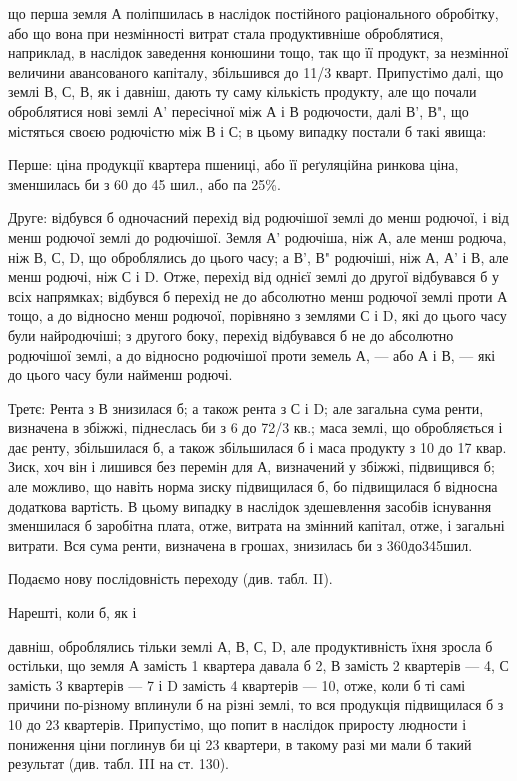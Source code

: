 що перша земля А поліпшилась в наслідок постійного раціонального обробітку,
або що вона при незмінності витрат стала продуктивніше оброблятися,
наприклад, в наслідок заведення конюшини тощо, так що її продукт, за незмінної
величини авансованого капіталу, збільшився до 11/3 кварт. Припустімо
далі, що землі В, С, В, як і давніш, дають ту саму кількість продукту, але що
почали оброблятися нові землі А' пересічної між А і В родючости, далі В', В", що
містяться своєю родючістю між В і С; в цьому випадку постали б такі явища:

Перше: ціна продукції квартера пшениці, або її реґуляційна ринкова
ціна, зменшилась би з 60 до 45 шил., або па 25\%.

Друге: відбувся б одночасний перехід від родючішої землі до менш
родючої, і від менш родючої землі до родючішої. Земля А' родючіша, ніж А, але
менш родюча, ніж В, С, D, що оброблялись до цього часу; а В', В" родючіші, ніж
А, А' і В, але менш родючі, ніж С і D. Отже, перехід від однієї землі до другої
відбувався б у всіх напрямках; відбувся б перехід не до абсолютно
менш родючої землі проти А тощо, а до відносно менш родючої, порівняно
з землями С і D, які до цього часу були найродючіші; з другого боку, перехід
відбувався б не до абсолютно родючішої землі, а до відносно родючішої проти
земель А, — або А і В, — які до цього часу були найменш родючі.

Третє: Рента з В знизилася б; а також рента з С і D; але загальна
сума ренти, визначена в збіжжі, піднеслась би з 6 до 72/3 кв.; маса землі, що
обробляється і дає ренту, збільшилася б, а також збільшилася б і маса продукту
з 10 до 17 квар. Зиск, хоч він і лишився без перемін для А, визначений у
збіжжі, підвищився б; але можливо, що навіть норма зиску підвищилася б, бо
підвищилася б відносна додаткова вартість. В цьому випадку в наслідок здешевлення
засобів
існування
зменшилася б
заробітна плата,
отже, витрата
на змінний
капітал,
отже, і загальні
витрати. Вся
сума ренти,
визначена в
грошах, знизилась
би з
360до345шил.

Подаємо
нову послідовність
переходу
(див. табл. II).

Нарешті,
коли б, як і

давніш, оброблялись тільки землі А, В, С, D, але продуктивність їхня зросла б
остільки, що земля А замість 1 квартера давала б 2, В замість 2 квартерів — 4,
С замість 3 квартерів — 7 і D замість 4 квартерів — 10, отже, коли б ті самі
причини по-різному вплинули б на різні землі, то вся продукція підвищилася
б з 10 до 23 квартерів. Припустімо, що попит в наслідок приросту
людности і пониження ціни поглинув би ці 23 квартери, в такому разі ми
мали б такий результат (див. табл. III на ст. 130).

